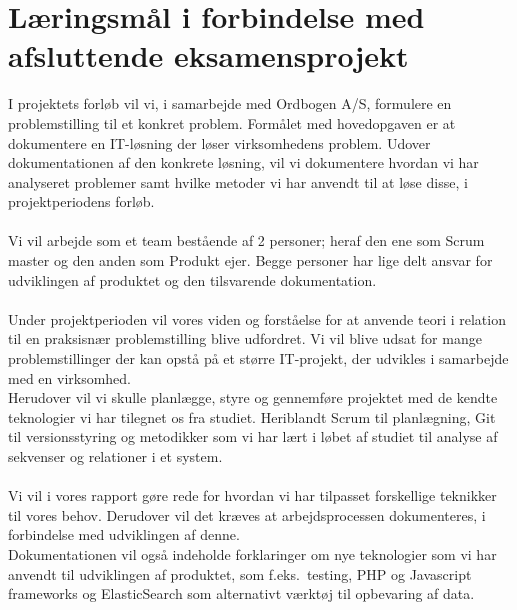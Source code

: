 \section{Læringsmål i forbindelse med afsluttende eksamensprojekt}
I projektets forløb vil vi, i samarbejde med Ordbogen A/S, formulere en problemstilling til et konkret problem.
Formålet med hovedopgaven er at dokumentere en IT-løsning der løser virksomhedens problem.
Udover dokumentationen af den konkrete løsning, vil vi dokumentere hvordan vi har analyseret problemer samt
hvilke metoder vi har anvendt til at løse disse, i projektperiodens forløb.
\\\\
Vi vil arbejde som et team bestående af 2 personer; heraf den ene som Scrum master og den anden som Produkt ejer.
Begge personer har lige delt ansvar for udviklingen af produktet og den tilsvarende dokumentation.
\\\\
Under projektperioden vil vores viden og forståelse for at anvende teori i relation til en praksisnær problemstilling blive udfordret.
Vi vil blive udsat for mange problemstillinger der kan opstå på et større IT-projekt, der udvikles i samarbejde med en virksomhed.
\\
Herudover vil vi skulle planlægge, styre og gennemføre projektet med de kendte teknologier vi har tilegnet os fra studiet.
Heriblandt Scrum til planlægning, Git til versionsstyring og metodikker som vi har lært i løbet af studiet til analyse af sekvenser og relationer
i et system.
\\\\
Vi vil i vores rapport gøre rede for hvordan vi har tilpasset forskellige teknikker til vores behov. Derudover vil det kræves at arbejdsprocessen
dokumenteres, i forbindelse med udviklingen af denne.
\\
Dokumentationen vil også indeholde forklaringer om nye teknologier som vi har anvendt til udviklingen af produktet, som f.eks.\ testing, PHP og Javascript
frameworks og ElasticSearch som alternativt værktøj til opbevaring af data.
